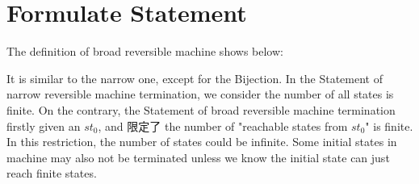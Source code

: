 \section{ Formulate Statement }
The definition of broad reversible machine shows below:



It is similar to the narrow one, except for the Bijection.
In the Statement of narrow reversible machine termination, we consider the number of all states is finite.
On the contrary, the Statement of broad reversible machine termination firstly given an $st_{0}$, and 限定了 the number of "reachable states from $st_{0}$" is finite.
In this restriction, the number of states could be infinite.  Some initial states in machine may also not be terminated unless we know the initial state can just reach finite states.


